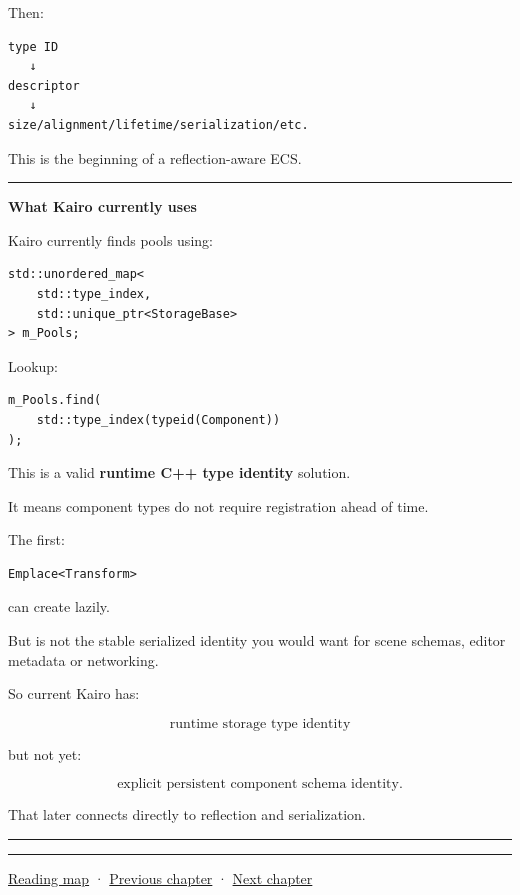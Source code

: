 Then:

\begin{verbatim}
type ID
   ↓
descriptor
   ↓
size/alignment/lifetime/serialization/etc.
\end{verbatim}

This is the beginning of a reflection-aware ECS.

\begin{center}\rule{0.5\linewidth}{0.5pt}\end{center}

\textbf{What Kairo currently uses}

Kairo currently finds pools using:

\begin{verbatim}
std::unordered_map<
    std::type_index,
    std::unique_ptr<StorageBase>
> m_Pools;
\end{verbatim}

Lookup:

\begin{verbatim}
m_Pools.find(
    std::type_index(typeid(Component))
);
\end{verbatim}

This is a valid \textbf{runtime C++ type identity} solution.

It means component types do not require registration ahead of time.

The first:

\begin{verbatim}
Emplace<Transform>
\end{verbatim}

can create  lazily.

But  is not the stable serialized identity you would want for scene schemas, editor metadata or networking.

So current Kairo has:

\[
\boxed{
\text{runtime storage type identity}
}
\]

but not yet:

\[
\boxed{
\text{explicit persistent component schema identity}.
}
\]

That later connects directly to reflection and serialization.

\begin{center}\rule{0.5\linewidth}{0.5pt}\end{center}

\begin{center}\rule{0.5\linewidth}{0.5pt}\end{center}

\hyperref[volume-reading-map]{Reading map} · \hyperref[05-engine-i-ch013-portable-startup-windows-events-and-input]{Previous chapter} · \hyperref[05-engine-i-ch015-sparse-set-components-and-generational-entity-handles]{Next chapter}
